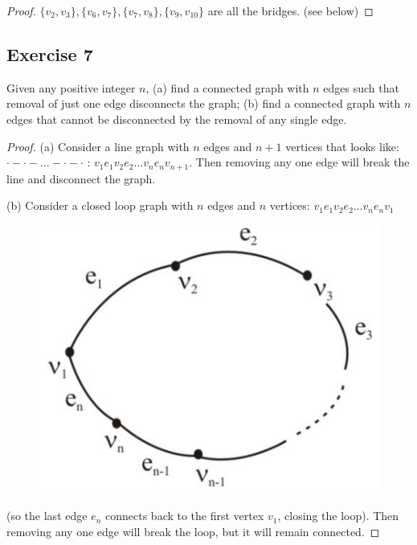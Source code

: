 \documentclass[14pt]{extarticle}
\begin{document}
\begin{proof}
\(\{v_2, v_3\}, \{v_6, v_7\}, \{v_7, v_8\}, \{v_9, v_{10}\}\) are all the bridges. (see below)
\end{proof}

\subsection{Exercise 7}
Given any positive integer \(n\), (a) find a connected graph with \(n\) edges such that removal of just one edge 
disconnects the graph; (b) find a connected graph with \(n\) edges that cannot be disconnected by the removal of any 
single edge.

\begin{proof}
(a) Consider a line graph with \(n\) edges and \(n+1\) vertices that looks like: \\\(\cdot-\cdot-\ldots-\cdot-\cdot\) 
: \(v_1e_1v_2e_2 \ldots v_ne_nv_{n+1}\). Then removing any one edge will break the line and disconnect the graph.

(b) Consider a closed loop graph with \(n\) edges and \(n\) vertices: \(v_1e_1v_2e_2 \ldots v_ne_nv_1\) 

\begin{figure}[ht!]
\centering
\includegraphics[scale=0.2]{../images/10.1.7.png}
\end{figure}

(so the last edge \(e_n\) connects back to the first vertex \(v_1\), closing the loop). Then removing any one edge will 
break the loop, but it will remain connected.
\end{proof}
\end{document}
